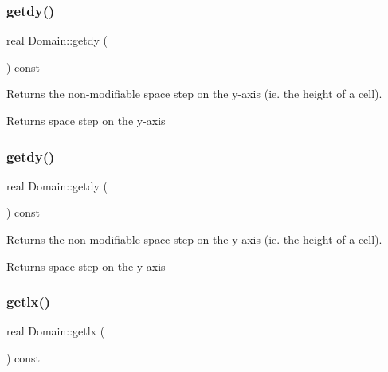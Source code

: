 \subsubsection{\texorpdfstring{getdy()}{getdy()}\hspace{0.1cm}{\footnotesize\ttfamily [1/2]}}
{\footnotesize\ttfamily real Domain\+::getdy (\begin{DoxyParamCaption}{ }\end{DoxyParamCaption}) const}



Returns the non-\/modifiable space step on the y-\/axis (ie. the height of a cell). 

\begin{DoxyReturn}{Returns}
space step on the y-\/axis 
\end{DoxyReturn}
\mbox{\label{classDomain_a5e62ab8a8b53f67cc3c30b6066b10aac}} 
\subsubsection{\texorpdfstring{getdy()}{getdy()}\hspace{0.1cm}{\footnotesize\ttfamily [2/2]}}
{\footnotesize\ttfamily real Domain\+::getdy (\begin{DoxyParamCaption}{ }\end{DoxyParamCaption}) const}



Returns the non-\/modifiable space step on the y-\/axis (ie. the height of a cell). 

\begin{DoxyReturn}{Returns}
space step on the y-\/axis 
\end{DoxyReturn}
\mbox{\label{classDomain_a510afad91fe81eb2ccef203a980f4223}} 
\subsubsection{\texorpdfstring{getlx()}{getlx()}\hspace{0.1cm}{\footnotesize\ttfamily [1/2]}}
{\footnotesize\ttfamily real Domain\+::getlx (\begin{DoxyParamCaption}{ }\end{DoxyParamCaption}) const}



